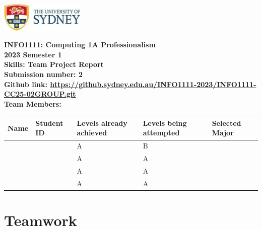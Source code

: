 \documentclass[a4paper, 11pt]{report}
\begin{document}
\begin{titlepage}
\begin{flushright}
\includegraphics[width=4cm]{USyd}\\[2cm]
\end{flushright}
\center 
\textbf{\huge INFO1111: Computing 1A Professionalism}\\[0.75cm]
\textbf{\huge 2023 Semester 1}\\[2cm]
\textbf{\huge Skills: Team Project Report}\\[3cm]

\textbf{\huge Submission number: 2}\\[0.75cm]
\textbf{Github link: \url{https://github.sydney.edu.au/INFO1111-2023/INFO1111-CC25-02GROUP.git}}\\[0.75cm]
\textbf{\huge Team Members:}\\[0.75cm]

\begin{tabular}{|p{}|p{}|p{}|p{}|p{}|}
	\hline
	Name & Student ID & \raggedright{Levels already achieved} & \raggedright{Levels being attempted} & Selected Major \\
	\hline
	\hline
	\raggedright{\studA} & \sidA & A & B & \majC \\
	\raggedright{\studB} & \sidB & A & A & \majB \\
	\raggedright{\studC} & \sidC & A & A & \majA \\
	\raggedright{\studD} & \sidD & A & A & \majD \\
	\hline
\end{tabular}
\thispagestyle{empty}
\end{titlepage}



\tableofcontents






\newpage
\section{Teamwork}
\label{sect-team}
\end{document}
